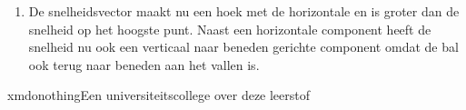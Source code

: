 \documentclass{ximera}
\begin{document}
\begin{denkvraag*}{}
\begin{oplossing}
\begin{enumerate}
        \item De snelheidsvector maakt nu een hoek met de horizontale en is groter dan de snelheid op het hoogste punt. Naast een horizontale component heeft de snelheid nu ook een verticaal naar beneden gerichte component omdat de bal ook terug naar beneden aan het vallen is.
    \end{enumerate}
\end{oplossing}
\end{denkvraag*} \nl

\begin{expandable}{xmdonothing}{Een universiteitscollege over deze leerstof}
\end{expandable}



\end{document}
